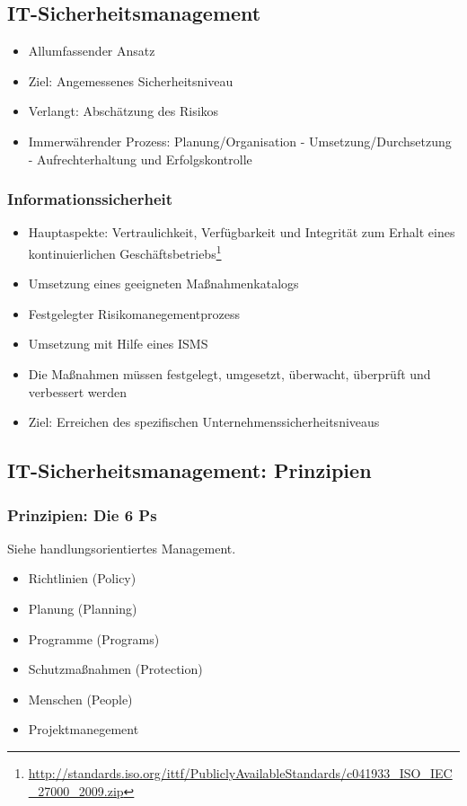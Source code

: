 \subsection{IT-Sicherheitsmanagement}
\begin{itemize}
	\item Allumfassender Ansatz
	\item Ziel: Angemessenes Sicherheitsniveau
	\item Verlangt: Abschätzung des Risikos
	\item Immerwährender Prozess: Planung/Organisation - Umsetzung/Durchsetzung - Aufrechterhaltung und Erfolgskontrolle
\end{itemize}

\subsubsection{Informationssicherheit}
\begin{itemize}
	\item Hauptaspekte: Vertraulichkeit, Verfügbarkeit und Integrität zum Erhalt eines kontinuierlichen Geschäftsbetriebs\footnote{\url{http://standards.iso.org/ittf/PubliclyAvailableStandards/c041933_ISO_IEC_27000_2009.zip}}
	\item Umsetzung eines geeigneten Maßnahmenkatalogs
	\item Festgelegter Risikomanegementprozess
	\item Umsetzung mit Hilfe eines ISMS
	\item Die Maßnahmen müssen festgelegt, umgesetzt, überwacht, überprüft und verbessert werden
	\item Ziel: Erreichen des spezifischen Unternehmenssicherheitsniveaus
\end{itemize}


\subsection{IT-Sicherheitsmanagement: Prinzipien}

\subsubsection{Prinzipien: Die 6 Ps}
Siehe handlungsorientiertes Management.
\begin{itemize}
	\item Richtlinien (Policy)
	\item Planung (Planning)
	\item Programme (Programs)
	\item Schutzmaßnahmen (Protection)
	\item Menschen (People)
	\item Projektmanegement
\end{itemize}

